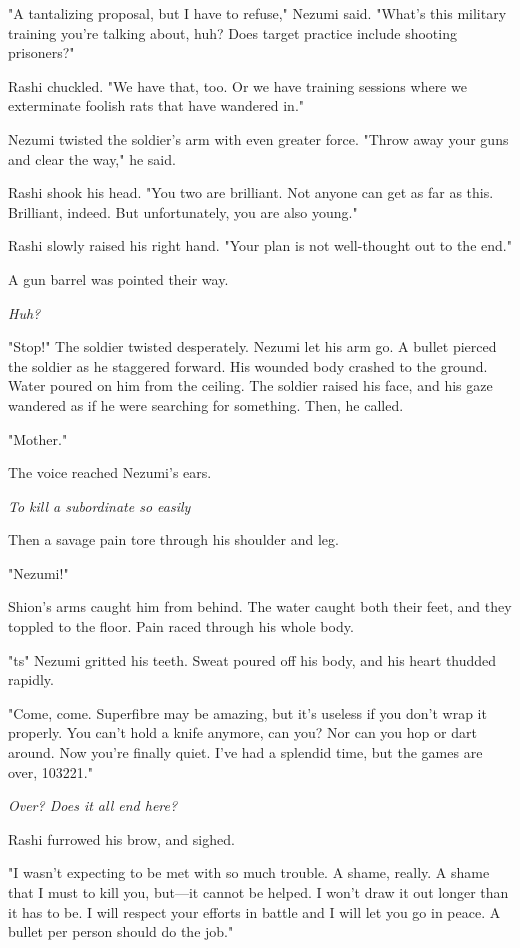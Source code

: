 "A tantalizing proposal, but I have to refuse," Nezumi said. "What's
this military training you're talking about, huh? Does target practice
include shooting prisoners?"

Rashi chuckled. "We have that, too. Or we have training sessions where
we exterminate foolish rats that have wandered in."

Nezumi twisted the soldier's arm with even greater force. "Throw away
your guns and clear the way," he said.

Rashi shook his head. "You two are brilliant. Not anyone can get as far
as this. Brilliant, indeed. But unfortunately, you are also young."

Rashi slowly raised his right hand. "Your plan is not well-thought out
to the end."

A gun barrel was pointed their way.

\emph{Huh?}

"Stop!" The soldier twisted desperately. Nezumi let his arm go. A bullet
pierced the soldier as he staggered forward. His wounded body crashed to
the ground. Water poured on him from the ceiling. The soldier raised his
face, and his gaze wandered as if he were searching for something. Then,
he called.

"Mother."

The voice reached Nezumi's ears.

\emph{To kill a subordinate so easily\el }

Then a savage pain tore through his shoulder and leg.

"Nezumi!"

Shion's arms caught him from behind. The water caught both their feet,
and they toppled to the floor. Pain raced through his whole body.

"\el ts\el " Nezumi gritted his teeth. Sweat poured off his body, and his
heart thudded rapidly.

"Come, come. Superfibre may be amazing, but it's useless if you don't
wrap it properly. You can't hold a knife anymore, can you? Nor can you
hop or dart around. Now you're finally quiet. I've had a splendid time,
but the games are over, 103221."

\emph{Over? Does it all end here?}

Rashi furrowed his brow, and sighed.

"I wasn't expecting to be met with so much trouble. A shame, really. A
shame that I must to kill you, but---it cannot be helped. I won't draw it
out longer than it has to be. I will respect your efforts in battle and
I will let you go in peace. A bullet per person should do the job."


